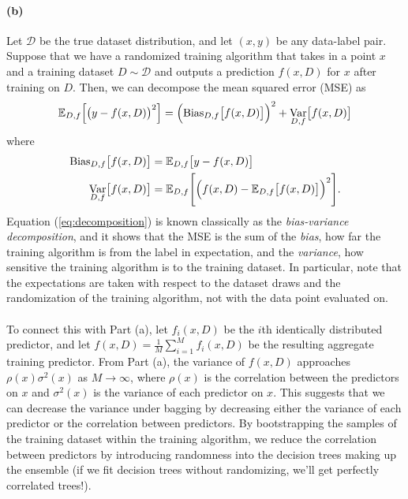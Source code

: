 \documentclass{exam}
\DeclareMathOperator{\Var}{Var}
\begin{document}
\paragraph{(b)} Let $\mathcal{D}$ be the true dataset distribution, and let $(x,y)$ be any data-label pair. Suppose that we have a randomized training algorithm that takes in a point $x$ and a training dataset $D \sim \mathcal{D}$ and outputs a prediction $f(x, D)$ for $x$ after training on $D$. Then, we can decompose the mean squared error (MSE) as
\begin{equation}\label{eq:decomposition}
    \mathbb{E}_{D, f}\Bigl[\bigl(y-f(x,D)\bigr)^2\Bigr]
    = \Bigl(\text{Bias}_{D,f}\bigl[f(x,D)\bigr]\Bigr)^2
    + \Var_{D,f}\bigl[f(x,D)\bigr]
\end{equation}
where 
\begin{align*}
    \text{Bias}_{D,f}\bigl[f(x,D)\bigr]
    &= \mathbb{E}_{D,f}\bigl[y-f(x,D)\bigr] \\
    \Var_{D,f}\bigl[f(x,D)\bigr]
    &= \mathbb{E}_{D,f}\Biggl[\Bigl(f(x,D)-\mathbb{E}_{D,f}\bigl[f(x,D)\bigr]\Bigr)^2\Biggr].
\end{align*}
Equation (\ref{eq:decomposition}) is known classically as the \emph{bias-variance decomposition}, and it shows that the MSE is the sum of the \emph{bias}, how far the training algorithm is from the label in expectation, and the \emph{variance}, how sensitive the training algorithm is to the training dataset. In particular, note that the expectations are taken with respect to the dataset draws and the randomization of the training algorithm, not with the data point evaluated on.
\\\\
To connect this with Part (a), let $f_i(x,D)$ be the $i$th identically distributed predictor, and let $f(x,D)=\frac{1}{M}\sum_{i=1}^M f_i(x,D)$ be the resulting aggregate training predictor. 
From Part (a), the variance of $f(x,D)$ approaches $\rho(x)\sigma^2(x)$ as $M \to \infty$, where $\rho(x)$ is the correlation between the predictors on $x$ and $\sigma^2(x)$ is the variance of each predictor on $x$. This suggests that we can decrease the variance under bagging by decreasing either the variance of each predictor or the correlation between predictors. By bootstrapping the samples of the training dataset within the training algorithm, we reduce the correlation between predictors by introducing randomness into the decision trees making up the ensemble (if we fit decision trees without randomizing, we'll get perfectly correlated trees!).
\end{document}
